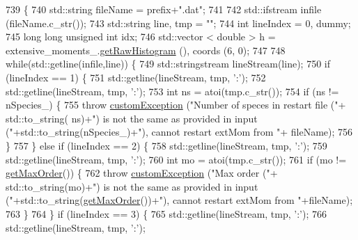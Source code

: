 \begin{DoxyCode}
739                                                                                          \{
740     std::string fileName = prefix+\textcolor{stringliteral}{".dat"};
741 
742     std::ifstream infile (fileName.c\_str());
743     std::string line, tmp = \textcolor{stringliteral}{""};
744     \textcolor{keywordtype}{int} lineIndex = 0, dummy;
745     \textcolor{keywordtype}{long} \textcolor{keywordtype}{long} \textcolor{keywordtype}{unsigned} \textcolor{keywordtype}{int} idx;
746     std::vector < double > h = extensive\_moments\_.\hyperlink{classhistogram_afa81289dc32207eb3c44f8bd746f0d1d}{getRawHistogram} (), coords (6, 0);
747 
748     \textcolor{keywordflow}{while}(std::getline(infile,line)) \{
749         std::stringstream lineStream(line);
750         \textcolor{keywordflow}{if} (lineIndex == 1) \{
751             std::getline(lineStream, tmp, \textcolor{charliteral}{':'});
752             std::getline(lineStream, tmp, \textcolor{charliteral}{':'});
753             \textcolor{keywordtype}{int} ns = atoi(tmp.c\_str());
754             \textcolor{keywordflow}{if} (ns != nSpecies\_) \{
755                 \textcolor{keywordflow}{throw} \hyperlink{classcustom_exception}{customException} (\textcolor{stringliteral}{"Number of speces in restart file ("}+ std::to\_string(
      ns)+\textcolor{stringliteral}{") is not the same as provided in input ("}+std::to\_string(nSpecies\_)+\textcolor{stringliteral}{"), cannot restart extMom from "}+
      fileName);
756             \}
757         \} \textcolor{keywordflow}{else} \textcolor{keywordflow}{if} (lineIndex == 2) \{
758             std::getline(lineStream, tmp, \textcolor{charliteral}{':'});
759             std::getline(lineStream, tmp, \textcolor{charliteral}{':'});
760             \textcolor{keywordtype}{int} mo = atoi(tmp.c\_str());
761             \textcolor{keywordflow}{if} (mo != \hyperlink{classsim_system_afe08187d318113c33bda890c69570c36}{getMaxOrder}()) \{
762                 \textcolor{keywordflow}{throw} \hyperlink{classcustom_exception}{customException} (\textcolor{stringliteral}{"Max order ("}+ std::to\_string(mo)+\textcolor{stringliteral}{") is not the same
       as provided in input ("}+std::to\_string(\hyperlink{classsim_system_afe08187d318113c33bda890c69570c36}{getMaxOrder}())+\textcolor{stringliteral}{"), cannot restart extMom from "}+fileName);
763             \}
764         \} \textcolor{keywordflow}{if} (lineIndex == 3) \{
765             std::getline(lineStream, tmp, \textcolor{charliteral}{':'});
766             std::getline(lineStream, tmp, \textcolor{charliteral}{':'});

\end{DoxyCode}
